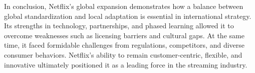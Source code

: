 \documentclass[letterpaper, 12pt]{report}
\begin{document}
In conclusion, Netflix’s global expansion demonstrates how a balance between
global standardization and local adaptation is essential in international
strategy. Its strengths in technology, partnerships, and phased learning
allowed it to overcome weaknesses such as licensing barriers and cultural gaps.
At the same time, it faced formidable challenges from regulations, competitors,
and diverse consumer behaviors. Netflix’s ability to remain customer-centric,
flexible, and innovative ultimately positioned it as a leading force in the
streaming industry.

\printbibliography
\end{document}
